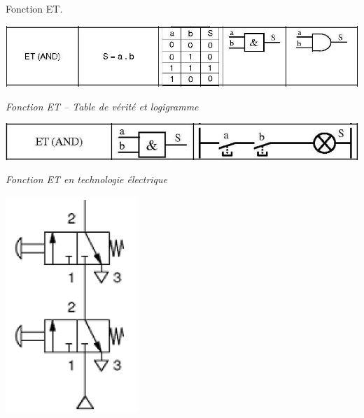 \documentclass[11pt,oneside]{article}
\begin{document}
\begin{exemple}
Fonction ET.

\begin{minipage}[c]{.3\linewidth}
\begin{center}
\includegraphics[width=.9\textwidth]{png/et_logi}

\textit{Fonction ET -- Table de vérité et logigramme}
\end{center}
\end{minipage} \hfill
\begin{minipage}[c]{.3\linewidth}
\begin{center}
\includegraphics[width=.9\textwidth]{png/et_elec}

\textit{Fonction ET en technologie électrique}
\end{center}
\end{minipage} \hfill
\begin{minipage}[c]{.3\linewidth}
\begin{center}
\includegraphics[width=.9\textwidth]{png/et_pneu}


\end{center}
\end{minipage}
\end{exemple}
\end{document}
